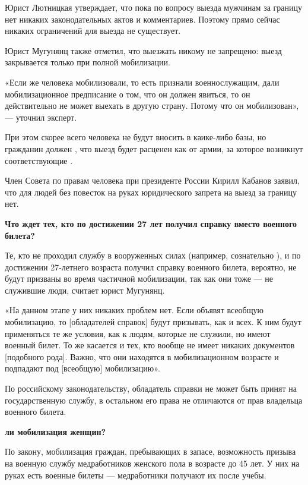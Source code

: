 Юрист Лютницкая утверждает, что пока по вопросу  выезда мужчинам за границу нет никаких законодательных актов и комментариев. Поэтому прямо сейчас никаких ограничений для выезда не существует.

Юрист Мугунянц также отметил, что выезжать никому не запрещено: выезд закрывается только при полной мобилизации.

«Если же человека мобилизовали, то есть признали военнослужащим, дали мобилизационное предписание о том, что он должен явиться, то он действительно не может выехать в другую страну. Потому что он мобилизован», — уточнил эксперт.

При этом скорее всего человека не будут вносить в каике-либо базы, но гражданин должен , что выезд будет расценен как  от армии, за которое возникнут соответствующие .

Член Совета по правам человека при президенте России Кирилл Кабанов заявил, что для людей без повесток на руках юридического запрета на выезд за границу нет.

\textbf{Что ждет тех, кто по достижении 27 лет получил справку вместо военного билета?}

Те, кто не проходил службу в вооруженных силах  (например, сознательно ), и по достижении 27-летнего возраста получил справку  военного билета, вероятно, не будут призваны во время частичной мобилизации, так как они тоже — не служившие люди, считает юрист Мугунянц.

«На данном этапе у них никаких проблем нет. Если объявят всеобщую мобилизацию, то [обладателей справок] будут призывать, как и всех. К ним будут применяться те же условия, как к людям, которые не служили, но имеют военный билет. То же касается и тех, кто вообще не имеет никаких документов [подобного рода]. Важно, что они находятся в мобилизационном возрасте и подпадают под [всеобщую] мобилизацию».

По российскому законодательству, обладатель справки не может быть принят на государственную службу, в остальном его права не отличаются от прав владельца военного билета.

\textbf{ ли мобилизация женщин?}

По закону, мобилизация граждан, пребывающих в запасе,  возможность призыва на военную службу медработников женского пола в возрасте до 45 лет. У них на руках есть военные билеты — медработники получают их после учебы.

